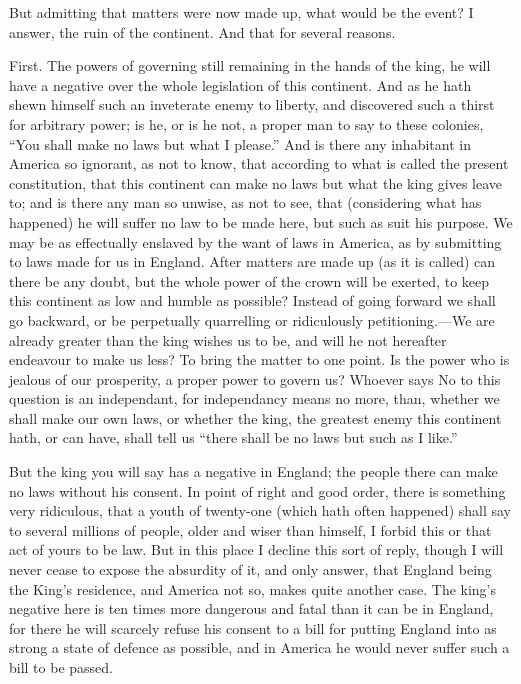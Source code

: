 \documentclass[12pt,oneside]{memoir}
\begin{document}
But admitting that matters were now made up, what would be the event?
I answer, the ruin of the continent. And that for several reasons.

First. The powers of governing still remaining in the hands of the
king, he will have a negative over the whole legislation of this
continent. And as he hath shewn himself such an inveterate enemy to
liberty, and discovered such a thirst for arbitrary power; is he, or
is he not, a proper man to say to these colonies, ``You shall make no
laws but what I please.'' And is there any inhabitant in America so
ignorant, as not to know, that according to what is called the
present constitution, that this continent can make no laws but what
the king gives leave to; and is there any man so unwise, as not to
see, that (considering what has happened) he will suffer no law to
be made here, but such as suit his purpose. We may be as effectually
enslaved by the want of laws in America, as by submitting to laws
made for us in England. After matters are made up (as it is called)
can there be any doubt, but the whole power of the crown will be
exerted, to keep this continent as low and humble as possible?
Instead of going forward we shall go backward, or be perpetually
quarrelling or ridiculously petitioning.---We are already greater
than the king wishes us to be, and will he not hereafter endeavour
to make us less? To bring the matter to one point. Is the power who
is jealous of our prosperity, a proper power to govern us? Whoever
says No to this question is an independant, for independancy means
no more, than, whether we shall make our own laws, or whether the
king, the greatest enemy this continent hath, or can have, shall
tell us ``there shall be no laws but such as I like.''

But the king you will say has a negative in England; the people
there can make no laws without his consent. In point of right and
good order, there is something very ridiculous, that a youth of
twenty-one (which hath often happened) shall say to several millions
of people, older and wiser than himself, I forbid this or that act
of yours to be law. But in this place I decline this sort of reply,
though I will never cease to expose the absurdity of it, and only
answer, that England being the King's residence, and America not so,
makes quite another case. The king's negative here is ten times more
dangerous and fatal than it can be in England, for there he will
scarcely refuse his consent to a bill for putting England into as
strong a state of defence as possible, and in America he would never
suffer such a bill to be passed.
\end{document}
